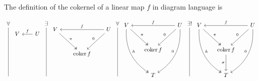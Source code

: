 \documentclass[12pt]{amsart}
\theoremstyle{definition}
\DeclareMathOperator{\coker}{\mathrm{coker}}
\begin{document}
\begin{enumerate}[start=0]
The definition of the cokernel of a linear map $f$ in diagram language is

\[
    \begin{tikzcd}[row sep=1cm, column sep=.7cm]
     \forall\arrow[ddd, dash]\\
     \\
     \\
     \;
    \end{tikzcd} 
    \begin{tikzcd}[row sep=1cm, column sep=.65cm]
     V& U\arrow[l,"f"']\\
     &\\
     &
    \end{tikzcd}
    \begin{tikzcd}[row sep=1cm, column sep=.7cm]
     \exists\arrow[ddd, dash]\\
     \\
     \\
     \;
    \end{tikzcd} 
    \begin{tikzcd}[row sep=1cm, column sep=.65cm]
     V&& U\arrow[ll,"f"']\\
     &\coker f\arrow[ul, twoheadleftarrow, "\pi"']\arrow[ur, "0", leftarrow]&\\
     & & 
    \end{tikzcd}
    \begin{tikzcd}[row sep=1cm, column sep=.7cm]
     \forall\arrow[ddd, dash,]\\
     \\
     \\
     \;
    \end{tikzcd}
    \begin{tikzcd}[row sep=1cm, column sep=.65cm]
     V&& U\arrow[ll,"f"']\\
     &\coker f\arrow[ul, twoheadleftarrow, "\pi"']\arrow[ur, "0", leftarrow]&\\
     &T\arrow[uul, twoheadleftarrow, "h"', bend left]\arrow[uur, "0", leftarrow, bend right]&
    \end{tikzcd}
    \begin{tikzcd}[row sep=1cm, column sep=.7cm]
     \exists!\arrow[ddd, dash]\\
     \\
     \\
     \;
    \end{tikzcd}
    \begin{tikzcd}[row sep=1cm, column sep=.65cm]
     V&& U\arrow[ll,"f"']\\
     &\coker f\arrow[ul, twoheadleftarrow, "\pi"']\arrow[ur, "0", leftarrow]&\\
     &T\arrow[uul, twoheadleftarrow, "h"', bend left]\arrow[uur, "0", leftarrow, bend right]\arrow[u, leftarrow, "\sigma"]&
    \end{tikzcd}
    \]


\end{enumerate}
\end{document}

